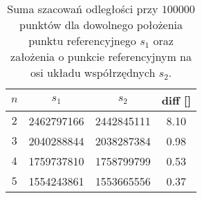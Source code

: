 \begin{table}[h]
	\centering
	\begin{tabular}{ | c | c | c | c |}
		\hline
		$ n $ & $ s_1 $ & $ s_2 $ & diff [\permil] \\ \hline
		$ 2 $ & 2462797166 & 2442845111 & 8.10  \\ \hline
		$ 3 $ & 2040288844 & 2038287384 & 0.98 \\ \hline
		$ 4 $ & 1759737810 & 1758799799 & 0.53 \\ \hline
		$ 5 $ & 1554243861 & 1553665556 & 0.37 \\ \hline
	\end{tabular}
	\caption{Suma szacowań odległości przy $ 100000 $ punktów dla dowolnego położenia punktu referencyjnego $ s_1 $ oraz założenia o punkcie referencyjnym na osi układu współrzędnych $ s_2 $.}\label{ti:with-condition-diff}
\end{table} 